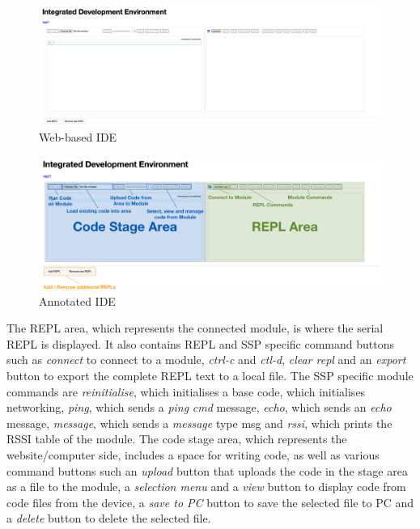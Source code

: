 \begin{figure}[H]
    \centering
    \includegraphics[width=\linewidth]{overleaf/images/ide_cropped.png}
    \caption{Web-based IDE}
    \label{fig:ide_raw_met}
\end{figure}
\begin{figure}[H]
    \centering
    \includegraphics[width=\linewidth]{overleaf/images/ide_ac.png}
    \caption{Annotated IDE}
    \label{fig:ide}
\end{figure}

The REPL area, which represents the connected module, is where the serial REPL is displayed. It also contains REPL and SSP specific command buttons such as \textit{connect} to connect to a module, \textit{ctrl-c} and \textit{ctl-d}, \textit{clear repl} and an \textit{export} button to export the complete REPL text to a local file. The SSP specific module commands are \textit{reinitialise}, which initialises a base code, which initialises networking, \textit{ping}, which sends a \textit{ping} \textit{cmd} message, \textit{echo}, which sends an \textit{echo} message, \textit{message}, which sends a \textit{message} type msg and \textit{rssi}, which prints the RSSI table of the module. 
The code stage area, which represents the website/computer side, includes a space for writing code, as well as various command buttons such an \textit{upload} button that uploads the code in the stage area as a file to the module, a \textit{selection menu} and a \textit{view} button to display code from code files from the device, a \textit{save to PC} button to save the selected file to PC and a \textit{delete} button to delete the selected file.\\

